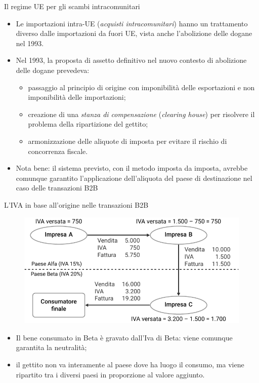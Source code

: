 \documentclass[aspectratio=149,11pt,italian]{beamer}
\begin{document}
\begin{frame}{Il regime UE per gli scambi intracomunitari}

  \begin{itemize}
  \item Le importazioni intra-UE (\emph{acquisti intracomunitari}) hanno un
    trattamento diverso dalle importazioni da fuori UE, vista anche
    l'abolizione delle dogane nel 1993.
  \item Nel 1993, la proposta di assetto definitivo nel nuovo contesto di
    abolizione delle dogane prevedeva:
    \begin{itemize}
    \item passaggio al principio di origine con imponibilità delle
      esportazioni e non imponibilità delle importazioni;
    \item creazione di una \emph{stanza di compensazione} (\emph{clearing
        house}) per risolvere il problema della ripartizione del gettito;
    \item armonizzazione delle aliquote di imposta per evitare il rischio di
      concorrenza fiscale.
    \end{itemize}
  \item Nota bene: il sistema previsto, con il metodo imposta da imposta,
    avrebbe comunque garantito l'applicazione dell'aliquota del paese di
    destinazione nel caso delle transazioni B2B
  \end{itemize}
\end{frame}

\begin{frame}{L'IVA in base all'origine nelle transazioni B2B}
\begin{figure}[htbp]
\centering
\includegraphics[width=.8\textwidth]{./figure/IVA-origine.pdf}
\end{figure}

\begin{itemize}
\item Il bene consumato in Beta è gravato dall'Iva di Beta: viene comunque
  garantita la neutralità;
\item il gettito non va interamente al paese dove ha luogo il consumo, ma
  viene ripartito tra i diversi paesi in proporzione al valore aggiunto.
\end{itemize}
\end{frame}
\end{document}
